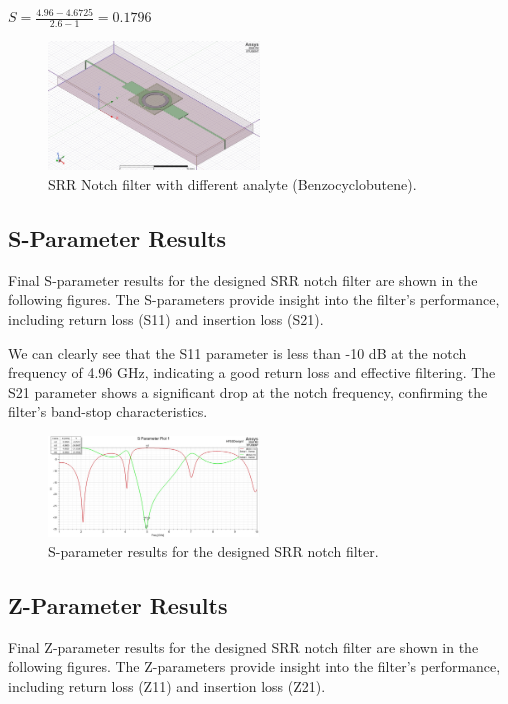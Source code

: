 \documentclass[conference]{IEEEtran}
\begin{document}
$ S = \frac{4.96 - 4.6725}{2.6-1} = 0.1796$
\begin{figure}[h]
\centering
    \includegraphics[width=0.5\textwidth]{Images/final_dielectric_sensitivity.jpg}
    \caption{SRR Notch filter with different analyte (Benzocyclobutene).}
\end{figure}

\subsection{S-Parameter Results}
Final S-parameter results for the designed SRR notch filter are shown in the following figures. The S-parameters provide insight into the filter's performance, including return loss (S11) and insertion loss (S21).

We can clearly see that the S11 parameter is less than -10 dB at the notch frequency of 4.96 GHz, indicating a good return loss and effective filtering. The S21 parameter shows a significant drop at the notch frequency, confirming the filter's band-stop characteristics.

\begin{figure}[h]
\centering
    \includegraphics[width=0.5\textwidth]{Images/Fiinal_S_Param_Plot.jpg}
    \caption{S-parameter results for the designed SRR notch filter.}
\end{figure}

\subsection{Z-Parameter Results}

Final Z-parameter results for the designed SRR notch filter are shown in the following figures. The Z-parameters provide insight into the filter's performance, including return loss (Z11) and insertion loss (Z21).
\end{document}
